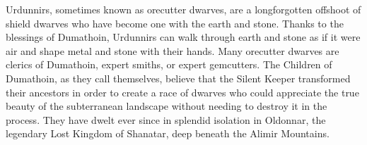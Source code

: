 
Urdunnirs, sometimes known as orecutter dwarves, are a longforgotten offshoot of shield dwarves who have become one with the earth and stone. Thanks to the blessings of Dumathoin, Urdunnirs can walk through earth and stone as if it were air and shape metal and stone with their hands. Many orecutter dwarves are clerics of Dumathoin, expert smiths, or expert gemcutters. The Children of Dumathoin, as they call themselves, believe that the Silent Keeper transformed their ancestors in order to create a race of dwarves who could appreciate the true beauty of the subterranean landscape without needing to destroy it in the process. They have dwelt ever since in splendid isolation in Oldonnar, the legendary Lost Kingdom of Shanatar, deep beneath the Alimir Mountains.

